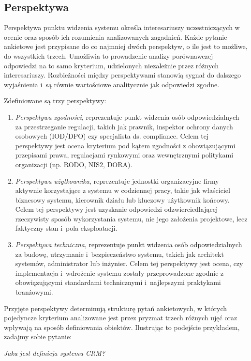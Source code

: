 \subsection{Perspektywa}
\label{perspektywa-pytań}
Perspektywa punktu widzenia systemu określa interesariuszy uczestniczących w ocenie oraz sposób ich rozumienia analizowanych zagadnień. Każde pytanie ankietowe jest przypisane do co najmniej dwóch perspektyw, o ile jest to możliwe, do wszystkich trzech. Umożliwia to prowadzenie analizy porównawczej odpowiedzi na to samo kryterium, udzielonych niezależnie przez różnych interesariuszy. Rozbieżności między perspektywami stanowią sygnał do dalszego wyjaśnienia i~są równie wartościowe analitycznie jak odpowiedzi zgodne.

Zdefiniowane są trzy perspektywy:
\begin{enumerate}[label=(\roman*)]
  \item \textit{Perspektywa zgodności}, reprezentuje punkt widzenia osób odpowiedzialnych za przestrzeganie regulacji, takich jak prawnik, inspektor ochrony danych osobowych (IOD/DPO) czy specjalista ds. compliance. Celem tej perspektywy jest ocena kryterium pod kątem zgodności z obowiązującymi przepisami prawa, regulacjami rynkowymi oraz wewnętrznymi politykami organizacji (np. RODO, NIS2, DORA).

  \item  \textit{Perspektywa użytkownika}, reprezentuje jednostki organizacyjne firmy aktywnie korzystające z systemu w codziennej pracy, takie jak właściciel biznesowy systemu, kierownik działu lub kluczowy użytkownik końcowy. Celem tej perspektywy jest uzyskanie odpowiedzi odzwierciedlającej rzeczywisty sposób wykorzystania systemu, nie jego założenia projektowe, lecz faktyczny stan i~pola eksploatacji.

  \item \textit{Perspektywa techniczna}, reprezentuje punkt widzenia osób odpowiedzialnych za budowę, utrzymanie i~bezpieczeństwo systemu, takich jak architekt systemów, administrator lub inżynier. Celem tej perspektywy jest ocena, czy implementacja i~wdrożenie systemu zostały przeprowadzone zgodnie z obowiązującymi standardami technicznymi i~najlepszymi praktykami branżowymi.
\end{enumerate}


Przyjęte perspektywy determinują strukturę pytań ankietowych, w których pojedyncze kryterium analizowane jest przez pryzmat trzech różnych ujęć oraz wpływają na sposób definiowania obiektów. Ilustrując to podejście przykładem, zadajmy sobie pytanie:
\begin{center}
\vspace{1em} %
\textit{Jaka jest definicja systemu CRM?}
\end{center}


